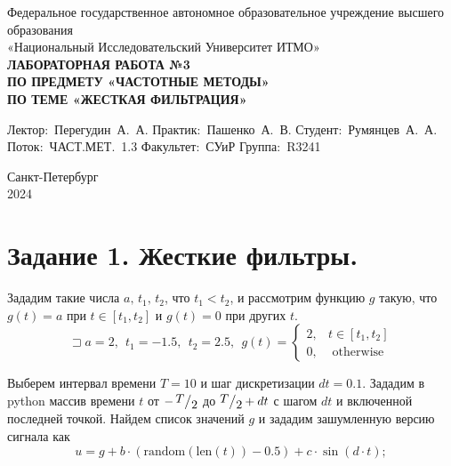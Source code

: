 \documentclass[a4paper, 16pt]{article}
\newcommand{\frc}[2]{\raisebox{2pt}{$#1$}\big/\raisebox{-3pt}{$#2$}}
\begin{document}
\begin{titlepage}

    \begin{center}
    \vfill
    
    Федеральное государственное автономное образовательное учреждение высшего образования\\
    «Национальный Исследовательский Университет ИТМО»\ \\
    
    \vfill
    {\large\bf ЛАБОРАТОРНАЯ РАБОТА №3\\
        ПО ПРЕДМЕТУ «ЧАСТОТНЫЕ МЕТОДЫ»\\
        ПО ТЕМЕ «ЖЕСТКАЯ ФИЛЬТРАЦИЯ»}
    \vfill
        
    \begin{flushright}
        \begin{minipage}{.45\textwidth}
        {
            \hbox{Лектор: Перегудин А. А.}
            \hbox{Практик: Пашенко А. В.}
            \hbox{Студент: Румянцев А. А.}
            \hbox{Поток: ЧАСТ.МЕТ. 1.3}
            \hbox{}
            \hbox{Факультет: СУиР}
            \hbox{Группа: R3241}
        }
        \end{minipage}
    \end{flushright}
    
    \vfill
            
    Санкт-Петербург\\
    2024
    \end{center}
    \end{titlepage}
    \setlength{\parskip}{1.5mm}
    
    \tableofcontents

    \newpage
    \section{Задание 1. Жесткие фильтры.}
    Зададим такие числа $a,\,t_1,\,t_2$, что $t_1<t_2$, и рассмотрим функцию $g$ такую, что
    $g(t)=a$ при $t\in[t_1,t_2]$ и $g(t)=0$ при других $t$. $$\sqsupset a=2,\ \ t_1=-1.5,\ \ t_2=2.5,\ \ g(t)=
    \begin{cases}
        2, & t\in[t_1,t_2]\\
        0, & \text{ otherwise}
    \end{cases}
    $$


    Выберем интервал времени $T=10$ и шаг дискретизации $dt=0.1$. Зададим в python массив времени $t$ от $-\,\frc{T}{2}$ до $\frc{T}{2}+dt$
    с шагом $dt$ и включенной последней точкой. Найдем список значений $g$ и зададим зашумленную версию сигнала как
    $$
    u=g+b\cdot(\text{random}(\text{len}(t))-0.5) + c\cdot \sin(d\cdot t);
    $$
\end{document}
